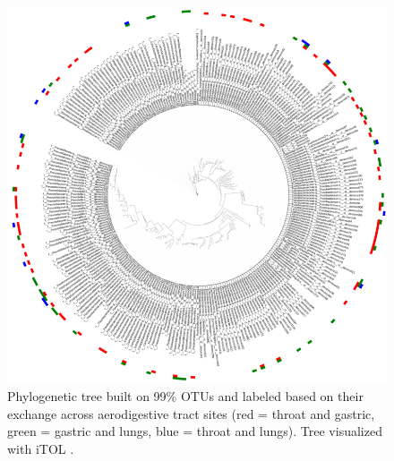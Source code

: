 \documentclass[12pt]{article}
\begin{document}
\newpage

\begin{figure}[h]
	\begin{center}
  	\includegraphics[scale=1.1]{rosen_tree}
	\caption{Phylogenetic tree built on 99\% OTUs and labeled based on their
	exchange across aerodigestive tract sites
	(red = throat and gastric, green = gastric and lungs, blue = 
	throat and lungs). Tree visualized with iTOL \cite{letunic-itol-2016}.}
	\label{fig:rosen_tree}
	\end{center}
\end{figure}
\end{document}
